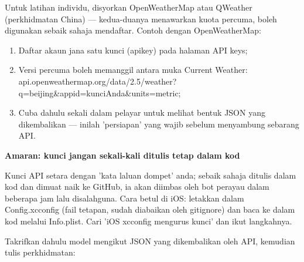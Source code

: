 


Untuk latihan individu, disyorkan OpenWeatherMap atau QWeather (perkhidmatan China) — kedua-duanya menawarkan kuota percuma, boleh digunakan sebaik sahaja mendaftar. Contoh dengan OpenWeatherMap:

\begin{enumerate}
  \item Daftar akaun jana satu kunci (apikey) pada halaman API keys;
  \item Versi percuma boleh memanggil antara muka Current Weather: api.openweathermap.org/data/2.5/weather? q=beijing\&appid=kunciAnda\&units=metric;
  \item Cuba dahulu sekali dalam pelayar untuk melihat bentuk JSON yang dikembalikan — inilah 'persiapan' yang wajib sebelum menyambung sebarang API.
\end{enumerate}

\textbf{Amaran: kunci jangan sekali-kali ditulis tetap dalam kod}\par

Kunci API setara dengan 'kata laluan dompet' anda; sebaik sahaja ditulis dalam kod dan dimuat naik ke GitHub, ia akan diimbas oleh bot perayau dalam beberapa jam lalu disalahguna. Cara betul di iOS: letakkan dalam Config.xcconfig (fail tetapan, sudah diabaikan oleh gitignore) dan baca ke dalam kod melalui Info.plist. Cari 'iOS xcconfig mengurus kunci' dan ikut langkahnya.


Takrifkan dahulu model mengikut JSON yang dikembalikan oleh API, kemudian tulis perkhidmatan:


